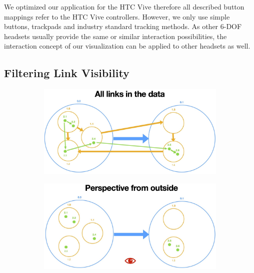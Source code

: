 We optimized our application for the HTC Vive therefore all described button mappings refer to the HTC Vive controllers. However, we only use simple buttons, trackpads and industry standard tracking methods. 
As other 6-DOF headsets usually provide the same or similar interaction possibilities, the interaction concept of our visualization can be applied to other headsets as well.\\

\subsection{Filtering Link Visibility}
\label{chap:ps-filterLinks}

\begin{figure}[h]
    \centering
    \begin{subfigure}[b]{0.6\columnwidth}
        \centering
        \includegraphics[width=\textwidth]{graphics/filterLinks/allLinks.jpg}
        \label{fig:linkFilter-all}
    \end{subfigure}
    \begin{subfigure}[b]{0.6\columnwidth}
        \centering
        \includegraphics[width=\textwidth]{graphics/filterLinks/outside.jpg}

\end{subfigure}
\end{figure}

